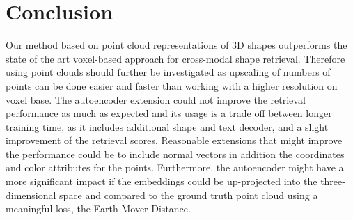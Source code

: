 \documentclass[10pt,twocolumn,letterpaper]{article}
\begin{document}
\section{Conclusion}
Our method based on point cloud representations of 3D shapes outperforms the state of the art voxel-based approach for cross-modal shape retrieval. Therefore using point clouds should further be investigated as upscaling of numbers of points can be done easier and faster than working with a higher resolution on voxel base. The autoencoder extension could not improve the retrieval performance as much as expected and its usage is a trade off between longer training time, as it includes additional shape and text decoder, and a slight improvement of the retrieval scores. Reasonable extensions that might improve the performance could be to include normal vectors in addition the coordinates and color attributes for the points. Furthermore, the autoencoder might have a more significant impact if the embeddings could be up-projected into the three-dimensional space and compared to the ground truth point cloud using a meaningful loss, \eg the Earth-Mover-Distance. 

{\small


}
\end{document}
